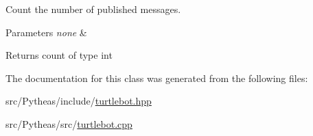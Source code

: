Count the number of published messages. 


\begin{DoxyParams}{Parameters}
{\em none} & \\
\hline
\end{DoxyParams}
\begin{DoxyReturn}{Returns}
count of type int 
\end{DoxyReturn}


The documentation for this class was generated from the following files\+:\begin{DoxyCompactItemize}
\item 
src/\+Pytheas/include/\hyperlink{turtlebot_8hpp}{turtlebot.\+hpp}\item 
src/\+Pytheas/src/\hyperlink{turtlebot_8cpp}{turtlebot.\+cpp}\end{DoxyCompactItemize}
